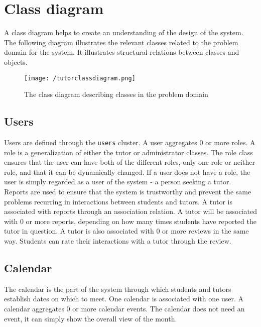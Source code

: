 \section{Class diagram}
A class diagram helps to create an understanding of the design of the system.
The following diagram illustrates the relevant classes related to the problem domain for the system.
It illustrates structural relations between classes and objects.

\begin{figure}[H]
    \texttt{[image: /tutorclassdiagram.png]}
     \caption{The class diagram describing classes in the problem domain}
     \label{fig:class-diagram}
 \end{figure}

\subsection{Users}
Users are defined through the \texttt{users} cluster.
A user aggregates 0 or more roles. 
A role is a generalization of either the tutor or administrator classes. 
The role class ensures that the user can have both of the different roles, only one role or neither role, and that it can be dynamically changed.
If a user does not have a role, the user is simply regarded as a user of the system - a person seeking a tutor. 
Reports are used to ensure that the system is trustworthy and prevent the same problems recurring in interactions between students and tutors.
A tutor is associated with reports through an association relation.
A tutor will be associated with 0 or more reports, depending on how many times students have reported the tutor in question.
A tutor is also associated with 0 or more reviews in the same way. 
Students can rate their interactions with a tutor through the review.

\subsection{Calendar}
The calendar is the part of the system through which students and tutors establish dates on which to meet. 
One calendar is associated with one user.
A calendar aggregates 0 or more calendar events. 
The calendar does not need an event, it can simply show the overall view of the month.

